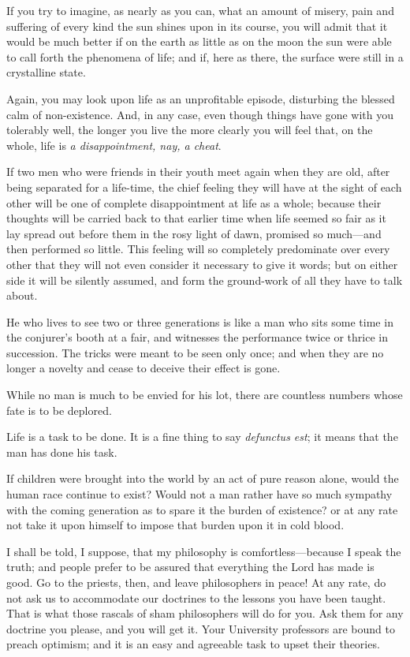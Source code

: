 If you try to imagine, as nearly as you can, what an amount of misery,
pain and suffering of every kind  the sun shines upon in its
course, you will admit that it would be much better if on the earth as
little as on the moon the sun were able to call forth the phenomena of
life; and if, here as there, the surface were still in a crystalline
state.

Again, you may look upon life as an unprofitable episode, disturbing
the blessed calm of non-existence. And, in any case, even though
things have gone with you tolerably well, the longer you live the more
clearly you will feel that, on the whole, life is \textit{a
disappointment, nay, a cheat}.

If two men who were friends in their youth meet again when they are
old, after being separated for a life-time, the chief feeling they
will have at the sight of each other will be one of complete
disappointment at life as a whole; because their thoughts will be
carried back to that earlier time when life seemed so fair as it lay
spread out before them in the rosy light of dawn, promised so
much---and then performed so little. This feeling will so completely
predominate over every other that they will not even consider it
necessary to give it words; but on either side it will be silently
assumed, and form the ground-work of all they have to talk about.

He who lives to see two or three generations is like a man who sits
some time in the conjurer's booth at a fair, and witnesses the
performance twice or thrice in succession. The tricks were meant to be
seen only once; and when they are no longer a novelty and cease to
deceive their effect is gone.

While no man is much to be envied for his lot, there are countless
numbers whose fate is to be deplored.

Life is a task to be done. It is a fine thing to say
\textit{defunctus est}; it means that the man has done his task.

If children were brought into the world by an act of pure reason
alone, would the human race continue to exist? Would not a man rather
have so much sympathy with the coming generation as to spare it the
burden of existence? or at any rate not take it upon himself to impose
that burden upon it in cold blood.

I shall be told, I suppose, that my philosophy is
comfortless---because I speak the truth; and people prefer to be
assured that everything the Lord has made is good. Go to the priests,
then, and leave philosophers in peace! At any rate, do not ask us to
accommodate our doctrines to the lessons you have been taught. That is
what those rascals of sham philosophers will do for you. Ask them for
any doctrine you please, and you will get it. Your University
professors are bound to preach optimism; and it is an easy and
agreeable task to upset their theories.

